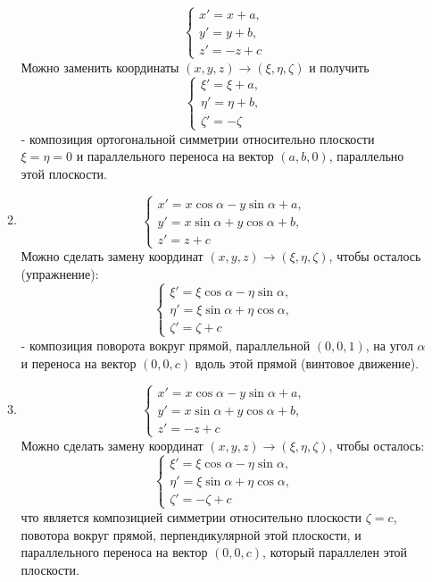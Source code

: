 \begin{enumerate}
\begin{enumerate}
        \[
        \begin{cases}
            x'=x+a,\\
            y'=y+b,\\
            z'=-z+c
        \end{cases}
        \]
        Можно заменить координаты  $(x,y,z)\to(\xi, \eta, \zeta)$ и получить 
        \[
        \begin{cases}
            \xi'=\xi+a,\\
            \eta'=\eta+b,\\
            \zeta'=-\zeta
        \end{cases}
        \]
        - композиция ортогональной симметрии относительно плоскости $\xi=\eta=0$ и параллельного переноса на вектор $(a,b,0)$, параллельно этой плоскости.
        \item
        \[
        \begin{cases}
            x'=x\cos{\alpha}-y\sin{\alpha}+a,\\
            y'=x\sin{\alpha}+y\cos{\alpha}+b,\\
            z'=z+c
        \end{cases}
        \]
        Можно сделать замену координат $(x,y,z)\to(\xi, \eta, \zeta)$, чтобы осталось (упражнение):
        \[\begin{cases}
            \xi'=\xi\cos{\alpha}-\eta\sin{\alpha},\\
            \eta'=\xi\sin{\alpha}+\eta\cos{\alpha},\\
            \zeta'=\zeta+c
        \end{cases}
        \]
        - композиция поворота вокруг прямой, параллельной $(0,0,1)$, на угол $\alpha$ и переноса на вектор $(0,0,c)$ вдоль этой прямой (винтовое движение).
        \item
        \[\begin{cases}
            x'=x\cos{\alpha}-y\sin{\alpha}+a,\\
            y'=x\sin{\alpha}+y\cos{\alpha}+b,\\
            z'=-z+c
        \end{cases}
        \]
        Можно сделать замену координат $(x,y,z)\to(\xi, \eta, \zeta)$, чтобы осталось:
        \[
        \begin{cases}
            \xi'=\xi\cos{\alpha}-\eta\sin{\alpha},\\
            \eta'=\xi\sin{\alpha}+\eta\cos{\alpha},\\
            \zeta'=-\zeta+c
        \end{cases}
        \]
        что является композицией симметрии относительно плоскости $\zeta=c$, повотора вокруг прямой, перпендикулярной этой плоскости, и параллельного переноса на вектор $(0,0,c)$, который параллелен этой плоскости.
    \end{enumerate}
\end{enumerate}


